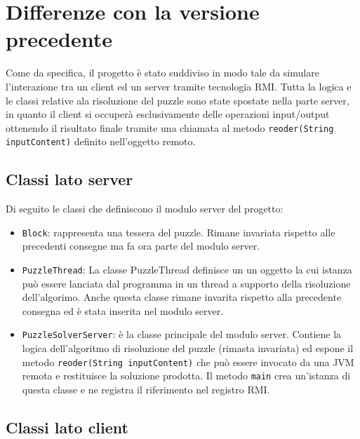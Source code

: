 %
%

\section{Differenze con la versione precedente}

Come da specifica, il progetto è stato suddiviso in modo tale da simulare l'interazione tra un client ed un server
tramite tecnologia RMI. Tutta la logica e le classi relative ala risoluzione del puzzle sono state spostate nella
parte server, in quanto il client si occuperà esclusivamente delle operazioni input/output ottenendo il risultato
finale tramite una chiamata al metodo \texttt{reoder(String inputContent)} definito nell'oggetto remoto.

\subsection{Classi lato server}

Di seguito le classi che definiscono il modulo server del progetto:

\begin{itemize}
    \item \texttt{Block}: rappresenta una tessera del puzzle. Rimane invariata rispetto alle precedenti consegne ma
    fa ora parte del modulo server.
    \item \texttt{PuzzleThread}: La classe PuzzleThread definisce un un oggetto la cui istanza può essere lanciata
    dal programma in un thread a supporto della risoluzione dell’algorimo. Anche questa classe rimane invarita
    rispetto alla precedente consegna ed è stata inserita nel modulo server.
    \item \texttt{PuzzleSolverServer}: è la classe principale del modulo server. Contiene la logica dell'algoritmo di
    risoluzione del puzzle (rimasta invariata) ed espone il metodo \texttt{reoder(String inputContent)} che può essere
    invocato da una JVM remota e restituisce la soluzione prodotta. Il metodo \texttt{main} crea un'istanza di questa
    classe e ne registra il riferimento nel registro RMI.
\end{itemize}


\subsection{Classi lato client}

